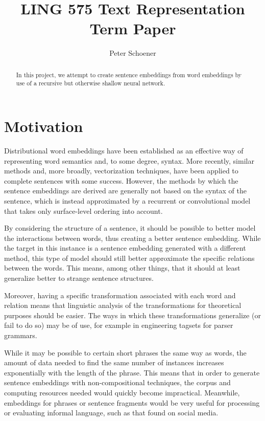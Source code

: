 \documentclass[11pt]{article}
\title{LING 575 \textemdash Text Representation \textemdash Term Paper}
\author{Peter Schoener}
\date{}
\begin{document}
\maketitle
\begin{abstract}
	In this project, we attempt to create sentence embeddings from word embeddings by use of a recursive but otherwise shallow neural network.
\end{abstract}

\section{Motivation}

Distributional word embeddings have been established as an effective way of representing word semantics and, to some degree, syntax. More recently, similar methods and, more broadly, vectorization techniques, have been applied to complete sentences with some success. However, the methods by which the sentence embeddings are derived are generally not based on the syntax of the sentence, which is instead approximated by a recurrent or convolutional model that takes only surface-level ordering into account.

By considering the structure of a sentence, it should be possible to better model the interactions between words, thus creating a better sentence embedding. While the target in this instance is a sentence embedding generated with a different method, this type of model should still better approximate the specific relations between the words. This means, among other things, that it should at least generalize better to strange sentence structures.

Moreover, having a specific transformation associated with each word and relation means that linguistic analysis of the transformations for theoretical purposes should be easier. The ways in which these transformations generalize (or fail to do so) may be of use, for example in engineering tagsets for parser grammars.

While it may be possible to certain short phrases the same way as words, the amount of data needed to find the same number of instances increases exponentially with the length of the phrase. This means that in order to generate sentence embeddings with non-compositional techniques, the corpus and computing resources needed would quickly become impractical. Meanwhile, embeddings for phrases or sentence fragments would be very useful for processing or evaluating informal language, such as that found on social media.
\end{document}
